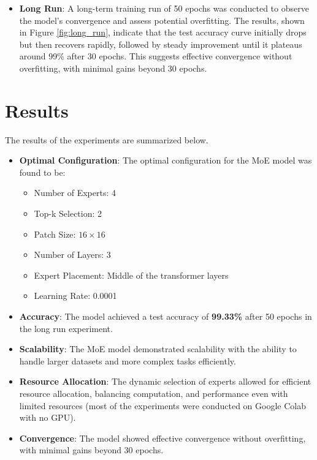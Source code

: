 \documentclass[a4paper,11pt]{article}
\begin{document}
\begin{itemize}

    \item \textbf{Long Run}: A long-term training run of 50 epochs was conducted to observe the model's convergence and assess potential overfitting. The results, shown in Figure \ref{fig:long_run}, indicate that the test accuracy curve initially drops but then recovers rapidly, followed by steady improvement until it plateaus around 99\% after 30 epochs. This suggests effective convergence without overfitting, with minimal gains beyond 30 epochs.


\end{itemize}


\section{Results}
The results of the experiments are summarized below.

\begin{itemize}
    \item \textbf{Optimal Configuration}: The optimal configuration for the MoE model was found to be:
    \begin{itemize}
        \item Number of Experts: 4
        \item Top-k Selection: 2
        \item Patch Size: $16 \times 16$
        \item Number of Layers: 3
        \item Expert Placement: Middle of the transformer layers
        \item Learning Rate: 0.0001
    \end{itemize}
    \item \textbf{Accuracy}: The model achieved a test accuracy of \textbf{99.33\%} after 50 epochs in the long run experiment.
    \item \textbf{Scalability}: The MoE model demonstrated scalability with the ability to handle larger datasets and more complex tasks efficiently.
    \item \textbf{Resource Allocation}: The dynamic selection of experts allowed for efficient resource allocation, balancing computation, and performance even with limited resources (most of the experiments were conducted on Google Colab with no GPU).
    \item \textbf{Convergence}: The model showed effective convergence without overfitting, with minimal gains beyond 30 epochs.
\end{itemize}
\end{document}
